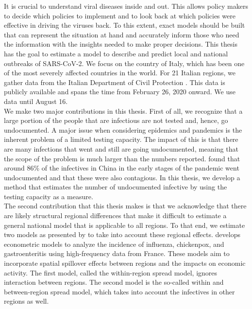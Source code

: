 \documentclass[12pt]{article}
\begin{document}
	It is crucial to understand viral diseases inside and out. This allows policy makers to decide which policies to implement and to look back at which policies were effective in driving the viruses back. To this extent, exact models should be built that can represent the situation at hand and accurately inform those who need the information with the insights needed to make proper %
	decisions. This thesis has the goal to estimate a model to describe and predict local and national outbreaks of SARS-CoV-2. We focus on the country of Italy, which has been one of the most severely affected countries in the world. For 21 Italian regions, we gather data %
	from the Italian Department of Civil Protection \parencite{Rosini2020Github}. This data is publicly available and spans the time from February 26, 2020 onward. We use data until August 16.
	\\
	
	We make two major contributions in this thesis. First of all, we recognize that a large portion of the people that are infectious are not tested and, hence, go undocumented. A major issue when considering epidemics and pandemics is the inherent problem of a limited testing capacity. %
	The impact of this is that there are many infections that went and still are going undocumented, meaning that the scope of the problem is much larger than the numbers reported. \textcite{li2020undocumented} found that around 86\% of the infectives in China in the early stages of the pandemic went undocumented and that these were also contagious. %
	In this thesis, we develop a method that estimates the number of undocumented infective by using the testing capacity as a measure.
	\\
	
	The second contribution that this thesis makes is that we acknowledge that there are likely structural regional differences that make it difficult to estimate a general national model that is applicable to all regions. %
	To that end, we estimate two models as presented by \textcite{adda2016economic} to take into account these regional effects. \textcite{adda2016economic} develops econometric models to analyze the incidence of influenza, chickenpox, and gastroenteritis using high-frequency data from France. These models aim to incorporate spatial spillover effects between regions and the impacts on economic activity. The first model, called the within-region spread model, ignores interaction between regions. The second model is the so-called within and between-region spread model, which takes into account the infectives in other regions as well.
	\\
	
\end{document}
